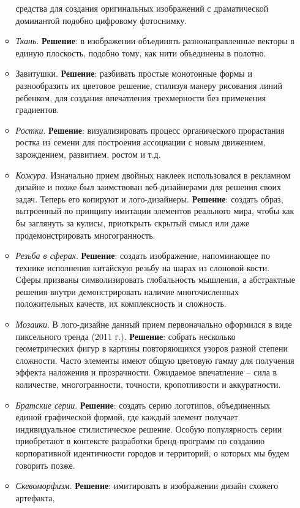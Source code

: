 \begin{enumerate}[label=\asbuk*)]
\begin{itemize}
    средства для создания оригинальных изображений с драматической доминантой подобно цифровому
    фотоснимку.
  \item \emph{Ткань}. \textbf{Решение}: в изображении объединять разнонаправленные векторы в единую
    плоскость, подобно тому, как нити объединены в полотно.
  \item Завитушки. \textbf{Решение}: разбивать простые монотонные формы и разнообразить их цветовое
    решение, стилизуя манеру рисования линий ребенком, для создания впечатления трехмерности без
    применения градиентов.
  \item \emph{Ростки}. \textbf{Решение}: визуализировать процесс органического прорастания ростка из
    семени для построения ассоциации с новым движением, зарождением, развитием, ростом и т.д.
  \item \emph{Кожура}. Изначально прием двойных наклеек использовался в рекламном дизайне и позже
    был заимствован веб-дизайнерами для решения своих задач. Теперь его копируют и
    лого-дизайнеры. \textbf{Решение}: создать образ, вытроенный по принципу имитации элементов
    реального мира, чтобы как бы заглянуть за кулисы, приоткрыть скрытый смысл или даже
    продемонстрировать многогранность.
  \item \emph{Резьба в сферах}. \textbf{Решение}: создать изображение,  напоминающее по технике
    исполнения китайскую резьбу на шарах из слоновой кости. Сферы призваны символизировать
    глобальность мышления, а абстрактные решения внутри демонстрировать наличие многочисленных
    положительных качеств, их комплексность и сложность.
  \item \emph{Мозаики}. В лого-дизайне данный прием первоначально оформился в виде пиксельного
    тренда (2011 г.). \textbf{Решение}: собрать несколько геометрических фигур в картины
    повторяющихся узоров разной степени сложности. Часто элементы имеют общую цветовую гамму для
    получения эффекта наложения и прозрачности. Ожидаемое впечатление -- сила в количестве,
    многогранности, точности, кропотливости и аккуратности.
  \item \emph{Братские серии}.  \textbf{Решение}: создать серию логотипов, объединенных единой
    графической формой, где каждый элемент получает индивидуальное стилистическое решение. Особую
    популярность серии приобретают в контексте разработки  бренд-программ по созданию корпоративной
    идентичности городов и территорий, о которых мы будем говорить позже.
  \item \emph{Скевоморфизм}. \textbf{Решение}: имитировать в изображении дизайн схожего артефакта,

\end{itemize}
\end{enumerate}
